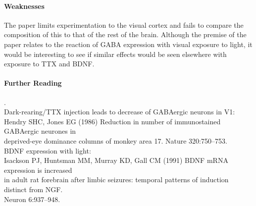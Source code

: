 \documentclass[11pt]{article}
\begin{document}
\paragraph{Weaknesses}
The paper limits experimentation to the visual cortex and fails to compare the composition
of this to that of the rest of the brain. Although the premise of the paper relates
to the reaction of GABA expression with visual exposure to light, it would be interesting
to see if similar effects would be seen elsewhere with exposure to TTX and BDNF.

\paragraph{Further Reading} \tiny{.}\\
\normalsize
Dark-rearing/TTX injection leads to decrease of GABAergic neurons in V1: \\
\hspace*{0.5in}Hendry SHC, Jones EG (1986) Reduction in number of immunostained GABAergic neurones
in \\
\hspace*{0.5in}deprived-eye dominance columns of monkey area 17. Nature 320:750–753. \\
BDNF expression with light: \\
\hspace*{0.5in} Isackson PJ, Huntsman MM, Murray KD, Gall CM (1991) BDNF mRNA expression is increased \\
\hspace*{0.5in} in adult rat forebrain after limbic seizures: temporal patterns of induction distinct from NGF.\\
\hspace*{0.5in} Neuron 6:937–948.\\
\end{document}
